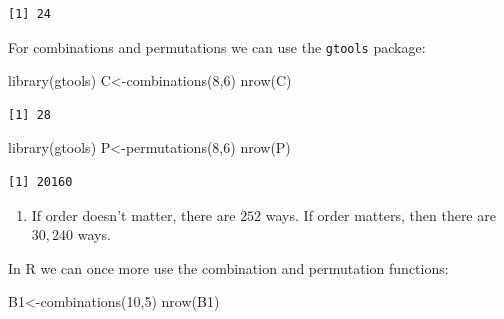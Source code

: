 \documentclass[
  letterpaper,
  DIV=11,
  numbers=noendperiod]{scrreprt}
\newenvironment{Shaded}{\begin{snugshade}}{\end{snugshade}}
\newcommand{\DecValTok}[1]{\textcolor[rgb]{0.68,0.00,0.00}{#1}}
\newcommand{\FunctionTok}[1]{\textcolor[rgb]{0.28,0.35,0.67}{#1}}
\newcommand{\NormalTok}[1]{\textcolor[rgb]{0.00,0.23,0.31}{#1}}
\newcommand{\OtherTok}[1]{\textcolor[rgb]{0.00,0.23,0.31}{#1}}
\providecommand{\tightlist}{%
  \setlength{\itemsep}{0pt}\setlength{\parskip}{0pt}}\usepackage{longtable,booktabs,array}
\begin{document}
\begin{verbatim}
[1] 24
\end{verbatim}

For combinations and permutations we can use the \texttt{gtools}
package:

\begin{Shaded}
\begin{Highlighting}[numbers=left,,]
\FunctionTok{library}\NormalTok{(gtools)}
\NormalTok{C}\OtherTok{\textless{}{-}}\FunctionTok{combinations}\NormalTok{(}\DecValTok{8}\NormalTok{,}\DecValTok{6}\NormalTok{)}
\FunctionTok{nrow}\NormalTok{(C)}
\end{Highlighting}
\end{Shaded}

\begin{verbatim}
[1] 28
\end{verbatim}

\begin{Shaded}
\begin{Highlighting}[numbers=left,,]
\FunctionTok{library}\NormalTok{(gtools)}
\NormalTok{P}\OtherTok{\textless{}{-}}\FunctionTok{permutations}\NormalTok{(}\DecValTok{8}\NormalTok{,}\DecValTok{6}\NormalTok{)}
\FunctionTok{nrow}\NormalTok{(P)}
\end{Highlighting}
\end{Shaded}

\begin{verbatim}
[1] 20160
\end{verbatim}

\begin{blackbox}

\begin{enumerate}
\def\labelenumi{\arabic{enumi}.}
\setcounter{enumi}{1}
\tightlist
\item
  If order doesn't matter, there are \(252\) ways. If order matters,
  then there are \(30,240\) ways.
\end{enumerate}

\end{blackbox}

In R we can once more use the combination and permutation functions:

\begin{Shaded}
\begin{Highlighting}[numbers=left,,]
\NormalTok{B1}\OtherTok{\textless{}{-}}\FunctionTok{combinations}\NormalTok{(}\DecValTok{10}\NormalTok{,}\DecValTok{5}\NormalTok{)}
\FunctionTok{nrow}\NormalTok{(B1)}
\end{Highlighting}
\end{Shaded}
\end{document}
